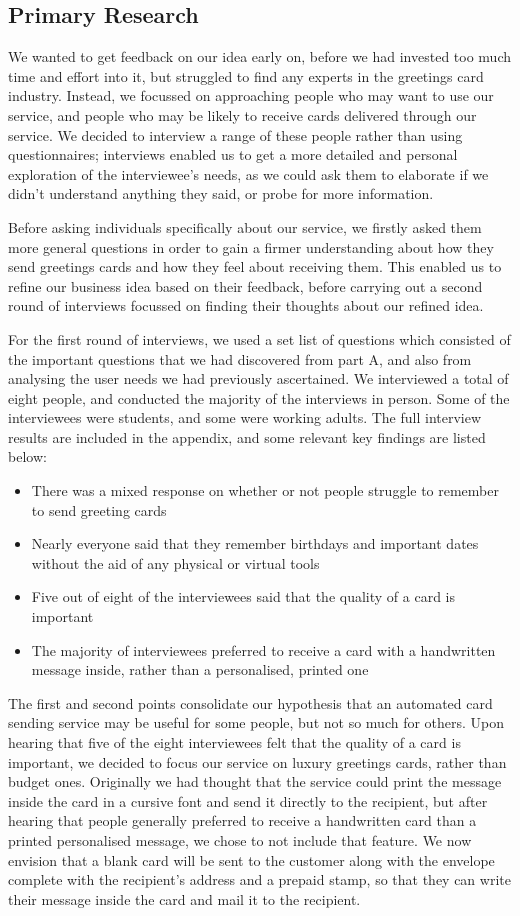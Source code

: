 \documentclass[10pt,a4paper]{article}
\begin{document}
\subsection*{Primary Research}
We wanted to get feedback on our idea early on, before we had invested too much time and effort into it, but struggled to find any experts in the greetings card industry. Instead, we focussed on approaching people who may want to use our service, and people who may be likely to receive cards delivered through our service. We decided to interview a range of these people rather than using questionnaires; interviews enabled us to get a more detailed and personal exploration of the interviewee's needs, as we could ask them to elaborate if we didn't understand anything they said, or probe for more information.

Before asking individuals specifically about our service, we firstly asked them more general questions in order to gain a firmer understanding about how they send greetings cards and how they feel about receiving them. This enabled us to refine our business idea based on their feedback, before carrying out a second round of interviews focussed on finding their thoughts about our refined idea.

For the first round of interviews, we used a set list of questions which consisted of the important questions that we had discovered from part A, and also from analysing the user needs we had previously ascertained. We interviewed a total of eight people, and conducted the majority of the interviews in person. Some of the interviewees were students, and some were working adults. The full interview results are included in the appendix, and some relevant key findings are listed below:
\begin{itemize}
  \item There was a mixed response on whether or not people struggle to remember to send greeting cards
  \item Nearly everyone said that they remember birthdays and important dates without the aid of any physical or virtual tools
  \item Five out of eight of the interviewees said that the quality of a card is important
  \item The majority of interviewees preferred to receive a card with a handwritten message inside, rather than a personalised, printed one
\end{itemize}
The first and second points consolidate our hypothesis that an automated card sending service may be useful for some people, but not so much for others. Upon hearing that five of the eight interviewees felt that the quality of a card is important, we decided to focus our service on luxury greetings cards, rather than budget ones. Originally we had thought that the service could print the message inside the card in a cursive font and send it directly to the recipient, but after hearing that people generally preferred to receive a handwritten card than a printed personalised message, we chose to not include that feature. We now envision that a blank card will be sent to the customer along with the envelope complete with the recipient's address and a prepaid stamp, so that they can write their message inside the card and mail it to the recipient.
\end{document}
